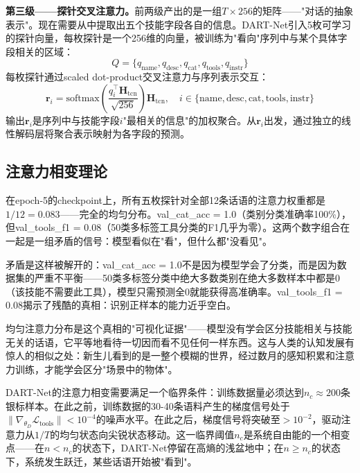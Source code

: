 \documentclass[12pt,a4paper]{ctexart}
\def\cL{\mathcal{L}}
\begin{document}
\textbf{第三级——探针交叉注意力。}前两级产出的是一组$T \times 256$的矩阵——"对话的抽象表示"。现在需要从中提取出五个技能字段各自的信息。DART-Net引入5枚可学习的探针向量，每枚探针是一个256维的向量，被训练为"看向"序列中与某个具体字段相关的区域：
\begin{equation}
Q = \{q_{\text{name}}, q_{\text{desc}}, q_{\text{cat}}, q_{\text{tools}}, q_{\text{instr}}\}
\label{eq:probes}
\end{equation}
每枚探针通过scaled dot-product交叉注意力与序列表示交互：
\begin{equation}
\mathbf{r}_i = \text{softmax}\left(\frac{q_i^\top \mathbf{H}_{\text{tcn}}}{\sqrt{256}}\right) \mathbf{H}_{\text{tcn}}, \quad i \in \{\text{name}, \text{desc}, \text{cat}, \text{tools}, \text{instr}\}
\label{eq:cross_attn}
\end{equation}
输出$\mathbf{r}_i$是序列中与技能字段$i$"最相关的信息"的加权聚合。从$\mathbf{r}_i$出发，通过独立的线性解码层将聚合表示映射为各字段的预测。

\subsection{注意力相变理论}

在epoch-5的checkpoint上，所有五枚探针对全部12条话语的注意力权重都是$1/12 = 0.083$——完全的均匀分布。val\_cat\_acc = 1.0（类别分类准确率100\%），但val\_tools\_f1 = 0.08（50类多标签工具分类的F1几乎为零）。这两个数字组合在一起是一组矛盾的信号：模型看似在"看"，但什么都"没看见"。

矛盾是这样被解开的：val\_cat\_acc = 1.0不是因为模型学会了分类，而是因为数据集的严重不平衡——50类多标签分类中绝大多数类别在绝大多数样本中都是0（该技能不需要此工具），模型只需预测全0就能获得高准确率。val\_tools\_f1 = 0.08揭示了残酷的真相：识别正样本的能力近乎空白。

均匀注意力分布是这个真相的"可视化证据"——模型没有学会区分技能相关与技能无关的话语，它平等地看待一切因而看不见任何一样东西。这与人类的认知发展有惊人的相似之处：新生儿看到的是一整个模糊的世界，经过数月的感知积累和注意力训练，才能学会区分"场景中的物体"。

DART-Net的注意力相变需要满足一个临界条件：训练数据量必须达到$n_c \approx 200$条银标样本。在此之前，训练数据的30-40条语料产生的梯度信号处于$\|\nabla_{\theta_D} \cL_{\text{tools}}\| < 10^{-4}$的噪声水平。在此之后，梯度信号将突破至$>10^{-2}$，驱动注意力从$1/T$的均匀状态向尖锐状态移动。这一临界阈值$n_c$是系统自由能的一个相变点——在$n < n_c$的状态下，DART-Net停留在高熵的浅盆地中；在$n \geq n_c$的状态下，系统发生跃迁，某些话语开始被"看到"。
\end{document}
